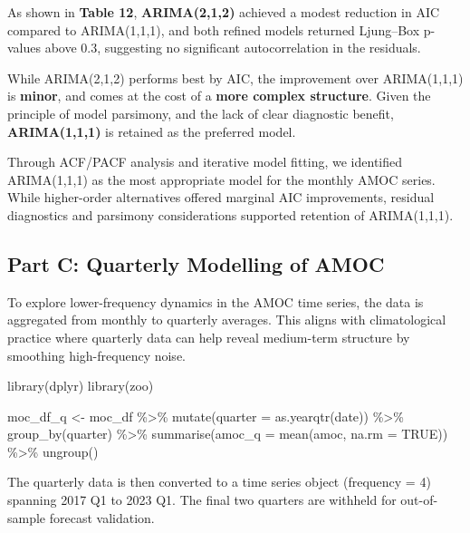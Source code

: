 \documentclass[
  11pt,
]{article}
\newenvironment{Shaded}{\begin{snugshade}}{\end{snugshade}}
\newcommand{\AttributeTok}[1]{\textcolor[rgb]{0.40,0.45,0.13}{#1}}
\newcommand{\ConstantTok}[1]{\textcolor[rgb]{0.56,0.35,0.01}{#1}}
\newcommand{\FunctionTok}[1]{\textcolor[rgb]{0.28,0.35,0.67}{#1}}
\newcommand{\NormalTok}[1]{\textcolor[rgb]{0.00,0.23,0.31}{#1}}
\newcommand{\OtherTok}[1]{\textcolor[rgb]{0.00,0.23,0.31}{#1}}
\newcommand{\SpecialCharTok}[1]{\textcolor[rgb]{0.37,0.37,0.37}{#1}}
\begin{document}
As shown in \textbf{Table 12}, \textbf{ARIMA(2,1,2)} achieved a modest
reduction in AIC compared to ARIMA(1,1,1), and both refined models
returned Ljung--Box p-values above 0.3, suggesting no significant
autocorrelation in the residuals.

While ARIMA(2,1,2) performs best by AIC, the improvement over
ARIMA(1,1,1) is \textbf{minor}, and comes at the cost of a \textbf{more
complex structure}. Given the principle of model parsimony, and the lack
of clear diagnostic benefit, \textbf{ARIMA(1,1,1)} is retained as the
preferred model.

Through ACF/PACF analysis and iterative model fitting, we identified
ARIMA(1,1,1) as the most appropriate model for the monthly AMOC series.
While higher-order alternatives offered marginal AIC improvements,
residual diagnostics and parsimony considerations supported retention of
ARIMA(1,1,1).

\subsection{Part C: Quarterly Modelling of
AMOC}\label{part-c-quarterly-modelling-of-amoc}

To explore lower-frequency dynamics in the AMOC time series, the data is
aggregated from monthly to quarterly averages. This aligns with
climatological practice where quarterly data can help reveal medium-term
structure by smoothing high-frequency noise.

\begin{Shaded}
\begin{Highlighting}[]
\FunctionTok{library}\NormalTok{(dplyr)}
\FunctionTok{library}\NormalTok{(zoo)}

\NormalTok{moc\_df\_q }\OtherTok{\textless{}{-}}\NormalTok{ moc\_df }\SpecialCharTok{\%\textgreater{}\%}
  \FunctionTok{mutate}\NormalTok{(}\AttributeTok{quarter =} \FunctionTok{as.yearqtr}\NormalTok{(date)) }\SpecialCharTok{\%\textgreater{}\%}
  \FunctionTok{group\_by}\NormalTok{(quarter) }\SpecialCharTok{\%\textgreater{}\%}
  \FunctionTok{summarise}\NormalTok{(}\AttributeTok{amoc\_q =} \FunctionTok{mean}\NormalTok{(amoc, }\AttributeTok{na.rm =} \ConstantTok{TRUE}\NormalTok{)) }\SpecialCharTok{\%\textgreater{}\%}
  \FunctionTok{ungroup}\NormalTok{()}
\end{Highlighting}
\end{Shaded}

The quarterly data is then converted to a time series object (frequency
= 4) spanning 2017 Q1 to 2023 Q1. The final two quarters are withheld
for out-of-sample forecast validation.
\end{document}
